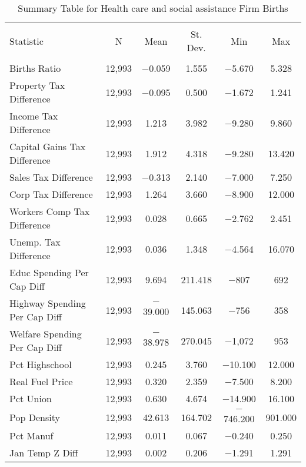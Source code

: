 
\begin{table}[!htbp] \centering 
  \caption{Summary Table for  Health care and social assistance Firm Births} 
  \label{62summary} 
\begin{tabular}{@{\extracolsep{5pt}}lccccc} 
\\[-1.8ex]\hline 
\hline \\[-1.8ex] 
Statistic & \multicolumn{1}{c}{N} & \multicolumn{1}{c}{Mean} & \multicolumn{1}{c}{St. Dev.} & \multicolumn{1}{c}{Min} & \multicolumn{1}{c}{Max} \\ 
\hline \\[-1.8ex] 
Births Ratio & 12,993 & $-$0.059 & 1.555 & $-$5.670 & 5.328 \\ 
Property Tax Difference & 12,993 & $-$0.095 & 0.500 & $-$1.672 & 1.241 \\ 
Income Tax Difference & 12,993 & 1.213 & 3.982 & $-$9.280 & 9.860 \\ 
Capital Gains Tax Difference & 12,993 & 1.912 & 4.318 & $-$9.280 & 13.420 \\ 
Sales Tax Difference & 12,993 & $-$0.313 & 2.140 & $-$7.000 & 7.250 \\ 
Corp Tax Difference & 12,993 & 1.264 & 3.660 & $-$8.900 & 12.000 \\ 
Workers Comp Tax Difference & 12,993 & 0.028 & 0.665 & $-$2.762 & 2.451 \\ 
Unemp. Tax Difference & 12,993 & 0.036 & 1.348 & $-$4.564 & 16.070 \\ 
Educ Spending Per Cap Diff & 12,993 & 9.694 & 211.418 & $-$807 & 692 \\ 
Highway Spending Per Cap Diff & 12,993 & $-$39.000 & 145.063 & $-$756 & 358 \\ 
Welfare Spending Per Cap Diff & 12,993 & $-$38.978 & 270.045 & $-$1,072 & 953 \\ 
Pct Highschool & 12,993 & 0.245 & 3.760 & $-$10.100 & 12.000 \\ 
Real Fuel Price & 12,993 & 0.320 & 2.359 & $-$7.500 & 8.200 \\ 
Pct Union & 12,993 & 0.630 & 4.674 & $-$14.900 & 16.100 \\ 
Pop Density & 12,993 & 42.613 & 164.702 & $-$746.200 & 901.000 \\ 
Pct Manuf & 12,993 & 0.011 & 0.067 & $-$0.240 & 0.250 \\ 
Jan Temp Z Diff & 12,993 & 0.002 & 0.206 & $-$1.291 & 1.291 \\ 

\end{tabular}
\end{table}
